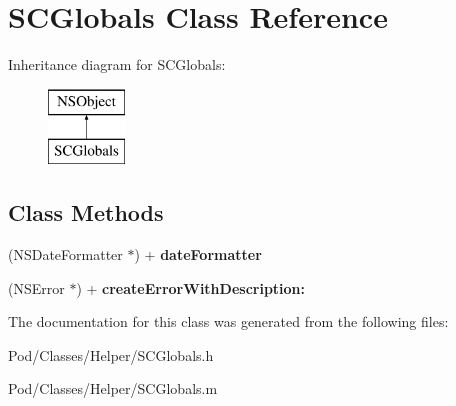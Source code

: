 \hypertarget{interface_s_c_globals}{}\section{S\+C\+Globals Class Reference}
\label{interface_s_c_globals}
Inheritance diagram for S\+C\+Globals\+:\begin{figure}[H]
\begin{center}
\leavevmode
\includegraphics[height=2.000000cm]{interface_s_c_globals}
\end{center}
\end{figure}
\subsection*{Class Methods}
\begin{DoxyCompactItemize}
\item 
(N\+S\+Date\+Formatter $\ast$) + {\bfseries date\+Formatter}\hypertarget{interface_s_c_globals_ae8467f00a9135a8f14abb0a16f65b831}{}\label{interface_s_c_globals_ae8467f00a9135a8f14abb0a16f65b831}

\item 
(N\+S\+Error $\ast$) + {\bfseries create\+Error\+With\+Description\+:}\hypertarget{interface_s_c_globals_ab83dd94c6aaadd674fb8aef892da9d84}{}\label{interface_s_c_globals_ab83dd94c6aaadd674fb8aef892da9d84}

\end{DoxyCompactItemize}


The documentation for this class was generated from the following files\+:\begin{DoxyCompactItemize}
\item 
Pod/\+Classes/\+Helper/S\+C\+Globals.\+h\item 
Pod/\+Classes/\+Helper/S\+C\+Globals.\+m\end{DoxyCompactItemize}

